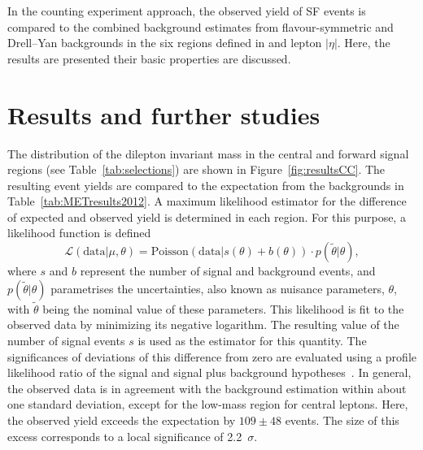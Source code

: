 \label{sec:counting}
In the counting experiment approach, the observed yield of SF events is compared to the combined background estimates from flavour-symmetric and Drell--Yan backgrounds in the six regions defined in \mll and lepton $|\eta|$. Here, the results are presented their basic properties are discussed.
\section{Results and further studies}

\label{sec:candcresults}
The distribution of the dilepton invariant mass in the central and forward signal regions (see Table~\ref{tab:selections}) are shown in Figure~\ref{fig:resultsCC}. The resulting event yields are compared to the expectation from the backgrounds in Table~\ref{tab:METresults2012}. A maximum likelihood estimator for the difference of expected and observed yield is determined in each region. For this purpose, a likelihood function is defined~\cite{HiggsTool1}
\begin{equation}
\label{eq:ML}
\mathcal{L}(\text{data}|\mu,\theta) = \text{Poisson}\left(\text{data}| s\left(\theta\right) + b\left(\theta\right)\right)\cdot p\left(\tilde{\theta}|\theta\right),
\end{equation}
where $s$ and $b$ represent the number of signal and background events, and $p(\tilde{\theta}|\theta)$ parametrises the uncertainties, also known as nuisance parameters, $\theta$, with $\tilde{\theta}$ being the nominal value of these parameters. This likelihood is fit to the observed data by minimizing its negative logarithm. The resulting value of the number of signal events $s$ is used as the estimator for this quantity. The significances of deviations of this difference from zero are evaluated using a profile likelihood ratio of the signal and signal plus background hypotheses~\cite{HiggsTool1}. In general, the observed data is in agreement with the background estimation within about one standard deviation, except for the low-mass region for central leptons. Here, the observed yield exceeds the expectation by $109\pm48$ events. The size of this excess corresponds to a local significance of 2.2~$\sigma$.  
